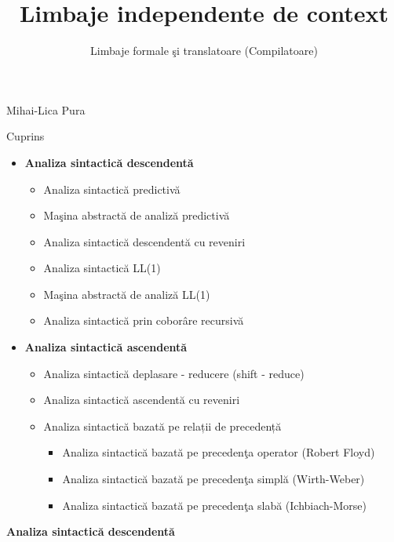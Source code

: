 \documentclass[pdf]{beamer}
\title{Limbaje independente de context}
\subtitle{Limbaje formale şi translatoare (Compilatoare)}
\begin{document}
\begin{frame}
	\titlepage
	
\begin{flushright}
Mihai-Lica Pura\\
\end{flushright}

\end{frame}



\begin{frame}{Cuprins}
\begin{itemize}
\item
\textbf{Analiza sintactică descendentă}
\begin{itemize}
\item
Analiza sintactică predictivă
\item
Maşina abstractă de analiză predictivă
\item
Analiza sintactică descendentă cu reveniri 
\item
Analiza sintactică LL(1)
\item
Maşina abstractă de analiză LL(1)
\item
Analiza sintactică prin coborâre recursivă
\end{itemize}
\item
\textbf{Analiza sintactică ascendentă}
\begin{itemize}
\item
Analiza sintactică deplasare - reducere (shift - reduce)
\item
Analiza sintactică ascendentă cu reveniri

\item
Analiza sintactică bazată pe relații de precedență
\begin{itemize}
\item
Analiza sintactică bazată pe precedenţa operator (Robert Floyd)
\item
Analiza sintactică bazată pe precedenţa simplă (Wirth-Weber)
\item
Analiza sintactică bazată pe precedenţa slabă (Ichbiach-Morse)
\end{itemize}
\end{itemize}
\end{itemize}
\end{frame}



\begin{frame}
\begin{center}
\textbf{Analiza sintactică descendentă}
\end{center}
\end{frame}
\end{document}
